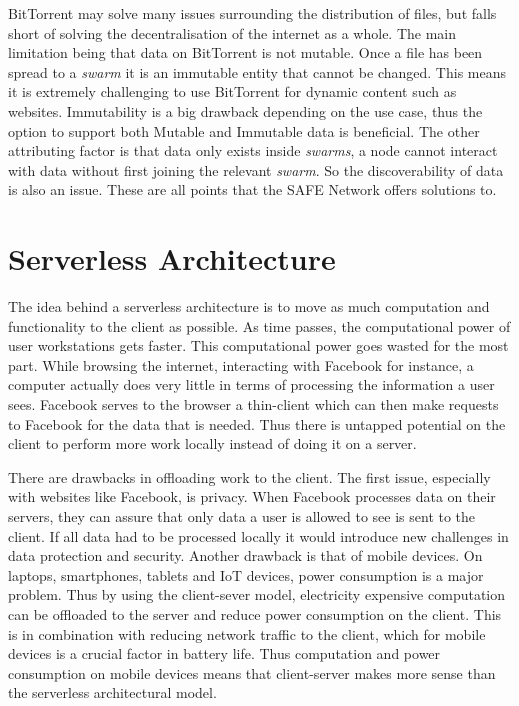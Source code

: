 BitTorrent may solve many issues surrounding the distribution of files, but falls short of solving the decentralisation of the internet as a whole. The main limitation being that data on BitTorrent is not mutable. Once a file has been spread to a \textit{swarm} it is an immutable entity that cannot be changed. This means it is extremely challenging to use BitTorrent for dynamic content such as websites. Immutability is a big drawback depending on the use case, thus the option to support both Mutable and Immutable data is beneficial. The other attributing factor is that data only exists inside \textit{swarms}, a node cannot interact with data without first joining the relevant \textit{swarm}. So the discoverability of data is also an issue. These are all points that the SAFE Network offers solutions to.

\section{Serverless Architecture}

The idea behind a serverless architecture is to move as much computation and functionality to the client as possible. As time passes, the computational power of user workstations gets faster. This computational power goes wasted for the most part. While browsing the internet, interacting with Facebook for instance, a computer actually does very little in terms of processing the information a user sees. Facebook serves to the browser a thin-client which can then make requests to Facebook for the data that is needed. Thus there is untapped potential on the client to perform more work locally instead of doing it on a server. 

There are drawbacks in offloading work to the client. The first issue, especially with websites like Facebook, is privacy. When Facebook processes data on their servers, they can assure that only data a user is allowed to see is sent to the client. If all data had to be processed locally it would introduce new challenges in data protection and security. Another drawback is that of mobile devices. On laptops, smartphones, tablets and IoT devices, power consumption is a major problem. Thus by using the client-sever model, electricity expensive computation can be offloaded to the server and reduce power consumption on the client. This is in combination with reducing network traffic to the client, which for mobile devices is a crucial factor in battery life. Thus computation and power consumption on mobile devices means that client-server makes more sense than the serverless architectural model.


